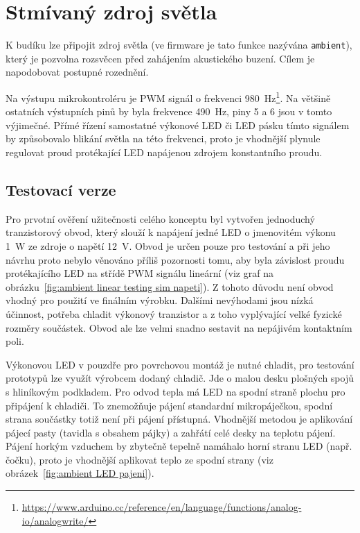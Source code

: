 \section{Stmívaný zdroj světla}
K budíku lze připojit zdroj světla (ve firmware je tato funkce nazývána
\texttt{ambient}), který je pozvolna rozsvěcen před zahájením akustického
buzení. Cílem je napodobovat postupné rozednění.

Na výstupu  mikrokontroléru je PWM signál o frekvenci
\SI{980}{\hertz}\footnote{\url{https://www.arduino.cc/reference/en/language/functions/analog-io/analogwrite/}}.
Na většině ostatních výstupních pinů by byla frekvence \SI{490}{\hertz}, piny 5
a 6 jsou v tomto výjimečné. %
Přímé řízení samostatné výkonové LED či LED pásku tímto signálem by způsobovalo
blikání světla na této frekvenci, proto je vhodnější plynule regulovat proud
protékající LED napájenou zdrojem konstantního proudu.


\subsection{Testovací verze}
Pro prvotní ověření užitečnosti celého konceptu byl vytvořen jednoduchý
tranzistorový obvod, který slouží k napájení jedné LED o jmenovitém výkonu
\SI{1}{\watt} ze zdroje o napětí \SI{12}{\volt}. Obvod je určen pouze pro
testování a při jeho návrhu proto nebylo věnováno příliš pozornosti tomu, aby
byla závislost proudu protékajícího LED na střídě PWM signálu lineární (viz
graf na obrázku~\vref{fig:ambient linear testing sim napeti}).
Z tohoto důvodu není obvod vhodný pro použití ve finálním výrobku. Dalšími
nevýhodami jsou nízká účinnost, potřeba chladit výkonový tranzistor a z toho
vyplývající velké fyzické rozměry součástek. Obvod ale lze velmi snadno
sestavit na nepájivém kontaktním poli.

Výkonovou LED v pouzdře pro povrchovou montáž je nutné chladit, pro testování
prototypů lze využít výrobcem dodaný chladič. Jde o malou desku plošných spojů
s hliníkovým podkladem. Pro odvod tepla má LED na spodní straně plochu pro
připájení k chladiči. To znemožňuje pájení standardní mikropáječkou, spodní
strana součástky totiž není při pájení přístupná. Vhodnější metodou je
aplikování pájecí pasty (tavidla s obsahem pájky) a zahřátí celé desky na
teplotu pájení. Pájení horkým vzduchem by zbytečně tepelně namáhalo horní
stranu LED (např. čočku), proto je vhodnější aplikovat teplo ze spodní strany
(viz obrázek~\vref{fig:ambient LED pajeni}).

